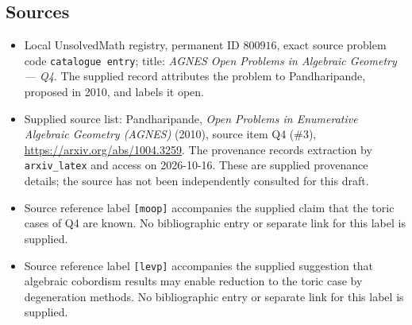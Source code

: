 \documentclass[11pt]{article}
\begin{document}
\subsection{Sources}
\begin{itemize}
\item Local UnsolvedMath registry, permanent ID \(800916\), exact source problem code \texttt{catalogue entry}; title: \emph{AGNES Open Problems in Algebraic Geometry --- Q4}. The supplied record attributes the problem to Pandharipande, proposed in 2010, and labels it open.
\item Supplied source list: Pandharipande, \emph{Open Problems in Enumerative Algebraic Geometry (AGNES)} (2010), source item Q4 (\#3), \url{https://arxiv.org/abs/1004.3259}. The provenance records extraction by \texttt{arxiv\_latex} and access on 2026-10-16. These are supplied provenance details; the source has not been independently consulted for this draft.
\item Source reference label \texttt{[moop]} accompanies the supplied claim that the toric cases of Q4 are known. No bibliographic entry or separate link for this label is supplied.
\item Source reference label \texttt{[levp]} accompanies the supplied suggestion that algebraic cobordism results may enable reduction to the toric case by degeneration methods. No bibliographic entry or separate link for this label is supplied.
\end{itemize}
\end{document}
